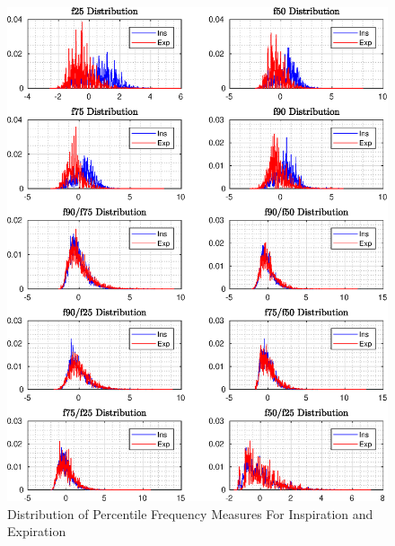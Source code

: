 \begin{figure}
	\begin{center}
		\includegraphics[width=\textwidth]{figures/percent_ins_exp.eps}
		\caption{Distribution of Percentile Frequency Measures For Inspiration and Expiration}
		\label{fig:percent_ins_exp}
	\end{center}
\end{figure}
